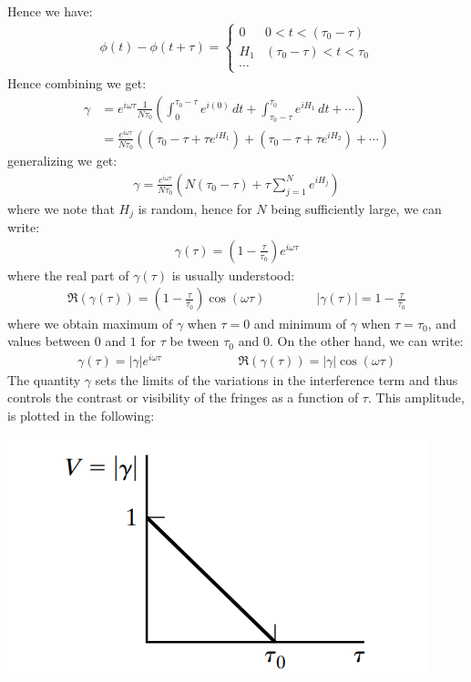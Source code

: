 \documentclass[11pt]{book}
\theoremstyle{break}
\theoremstyle{break}
\begin{document}
Hence we have:
\begin{align*}
\phi(t) - \phi(t+\tau) = \begin{cases} 0& 0<t<(\tau_0 - \tau)\\
H_1 & (\tau_0-\tau) < t< \tau_0\\
\cdots
\end{cases}
\end{align*}
Hence combining we get:
\begin{align*}
\gamma &= e^{i\omega \tau}\frac{1}{N \tau_0}\left( \int_0^{\tau_0 -\tau}e^{i(0)}\, dt+ \int_{\tau_0 - \tau}^{\tau_0 }e^{iH_1}\, dt + \cdots\right) \\
&= \frac{e^{i\omega \tau}}{N\tau_0}\left(( \tau_0 - \tau + \tau e^{iH_1} ) + (\tau_0 -\tau + \tau e^{iH_2}) +\cdots\right)
\end{align*}
generalizing we get:
\begin{align*}
\gamma = \frac{e^{i\omega \tau}}{N\tau_0}\left( N(\tau_0 -\tau) + \tau \sum_{j=1}^N e^{iH_j}\right)
\end{align*}
where we note that $H_j$ is random, hence for $N$ being sufficiently large, we can write:
\begin{align*}
\gamma(\tau) = \left( 1 - \frac{\tau}{\tau_0}\right)e^{i\omega \tau}
\end{align*}
where the real part of $\gamma(\tau)$ is usually understood:
\begin{align*}
\Re(\gamma(\tau)) = \left( 1- \frac{\tau}{\tau_0}\right) \cos(\omega \tau)\qquad\qquad |\gamma(\tau)| = 1-\frac{\tau}{\tau_0}
\end{align*}
where we obtain maximum of $\gamma$ when $\tau=0$ and minimum of $\gamma$ when $\tau=\tau_0$, and values between $0$ and $1$ for $\tau$ be tween $\tau_0$ and $0$. On the other hand, we can write:
\begin{align*}
\gamma(\tau) = |\gamma|e^{i\omega \tau} \qquad\qquad\qquad \Re(\gamma(\tau)) = |\gamma| \cos(\omega \tau)
\end{align*}
The quantity $\gamma$ sets the limits of the variations in the interference term and thus controls the contrast or visibility of the fringes as a function of $\tau$. This amplitude, is plotted in the following:
\begin{center}
\includegraphics[scale=0.6]{VGamma}
\end{center}
\end{document}
